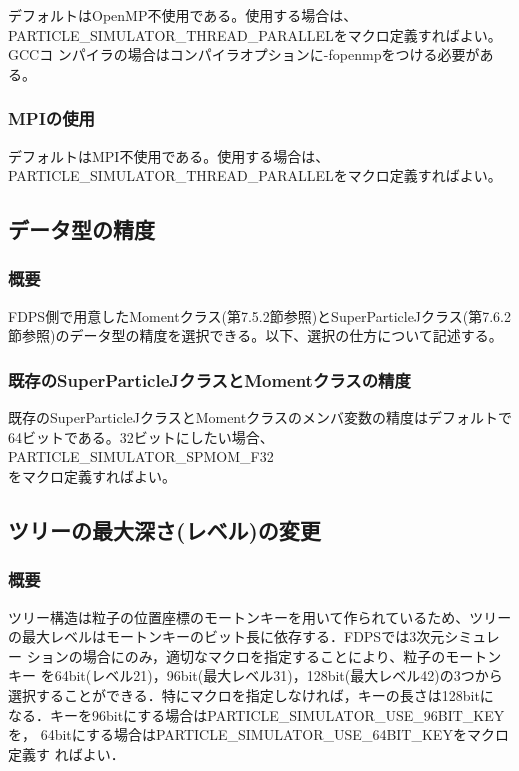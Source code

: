 デフォルトはOpenMP不使用である。使用する場合は、
\\ PARTICLE\_SIMULATOR\_THREAD\_PARALLELをマクロ定義すればよい。GCCコ
ンパイラの場合はコンパイラオプションに-fopenmpをつける必要がある。

\subsubsection{MPIの使用}

デフォルトはMPI不使用である。使用する場合は、
PARTICLE\_SIMULATOR\_THREAD\_PARALLELをマクロ定義すればよい。

\subsection{データ型の精度}
\subsubsection{概要}
FDPS側で用意したMomentクラス(第7.5.2節参照)とSuperParticleJクラス(第7.6.2節参照)のデータ型の精度を選択できる。以下、選択の仕方について記述する。

\subsubsection{既存のSuperParticleJクラスとMomentクラスの精度}
既存のSuperParticleJクラスとMomentクラスのメンバ変数の精度はデフォルトで64ビットである。32ビットにしたい場合、\\
PARTICLE\_SIMULATOR\_SPMOM\_F32 \\
をマクロ定義すればよい。





\subsection{ツリーの最大深さ(レベル)の変更}
\subsubsection{概要}
ツリー構造は粒子の位置座標のモートンキーを用いて作られているため、ツリー
の最大レベルはモートンキーのビット長に依存する．FDPSでは3次元シミュレー
ションの場合にのみ，適切なマクロを指定することにより、粒子のモートンキー
を64bit(レベル21)，96bit(最大レベル31)，128bit(最大レベル42)の3つから
選択することができる．特にマクロを指定しなければ，キーの長さは128bitに
なる．キーを96bitにする場合はPARTICLE\_SIMULATOR\_USE\_96BIT\_KEYを，
64bitにする場合はPARTICLE\_SIMULATOR\_USE\_64BIT\_KEYをマクロ定義す
ればよい．



